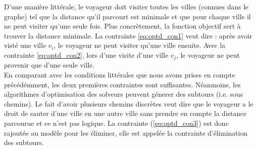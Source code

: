 \documentclass{article}
\begin{document}
D'une manière littérale, le voyageur doit visiter toutes les villes (connues dans le graphe) tel que la distance qu'il parcourt est minimale et que pour chaque ville il ne peut visiter qu'une seule fois. Plus concrètement, la fonction objectif sert à trouver la distance minimale. La contrainte \ref{eq:optd_con1} veut dire : après avoir visté une ville \(v_i\), le voyageur ne peut visiter qu'une ville ensuite. Avec la contrainte \ref{eq:optd_con2}, lors d'une visite d'une ville \(v_j\), le voyageur ne peut provenir que d'une seule ville.\\
En comparant avec les conditions littérales que nous avons prises en compte précédémment, les deux premières contraintes sont suffisantes. Néanmoins, les algorithmes d'optimisation des solveurs peuvent génerer des subtours (i.e. sous chemins). Le fait d'avoir plusieurs chemins discrètes veut dire que le voyageur a le droit de sauter d'une ville en une autre ville sans prendre en compte la distance parcourue et ce n'est pas logique. La contrainte (\ref{eq:optd_con3}) est donc rajoutée au modèle pour les éliminer, elle est appelée la contrainte d'élimination des subtours.\\
\end{document}
